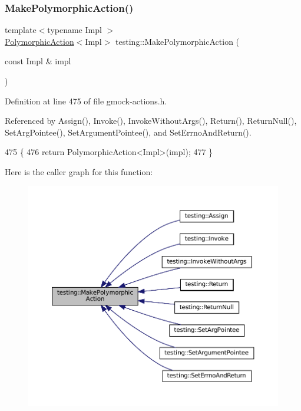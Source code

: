 \subsubsection{\texorpdfstring{Make\+Polymorphic\+Action()}{MakePolymorphicAction()}}
{\footnotesize\ttfamily template$<$typename Impl $>$ \\
\hyperlink{classtesting_1_1PolymorphicAction}{Polymorphic\+Action}$<$Impl$>$ testing\+::\+Make\+Polymorphic\+Action (\begin{DoxyParamCaption}\item[{const Impl \&}]{impl }\end{DoxyParamCaption})\hspace{0.3cm}{\ttfamily [inline]}}



Definition at line 475 of file gmock-\/actions.\+h.



Referenced by Assign(), Invoke(), Invoke\+Without\+Args(), Return(), Return\+Null(), Set\+Arg\+Pointee(), Set\+Argument\+Pointee(), and Set\+Errno\+And\+Return().


\begin{DoxyCode}
475                                                                        \{
476   \textcolor{keywordflow}{return} PolymorphicAction<Impl>(impl);
477 \}
\end{DoxyCode}
Here is the caller graph for this function\+:
\nopagebreak
\begin{figure}[H]
\begin{center}
\leavevmode
\includegraphics[width=350pt]{namespacetesting_a36bd06c5ea972c6df0bd9f40a7a94c65_icgraph}
\end{center}
\end{figure}
\mbox{\label{namespacetesting_a667ca94f190ec2e17ee2fbfdb7d3da04}} 
